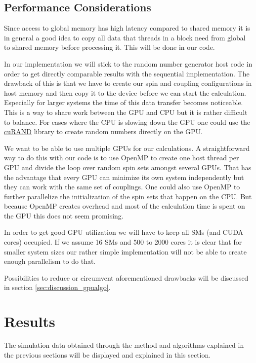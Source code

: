 \documentclass[paper=a4, fontsize=11pt]{scrartcl} %
\numberwithin{equation}{section} %
\numberwithin{figure}{section} %
\numberwithin{table}{section} %
\begin{document}
\subsection{Performance Considerations}
Since access to global memory has high latency compared to shared memory it is in general a good idea to copy all data that threads in a block need from global to shared memory before processing it. This will be done in our code.

In our implementation we will stick to the random number generator host code in order to get directly comparable results with the sequential implementation. The drawback of this is that we have to create our spin and coupling configurations in host memory and then copy it to the device before we can start the calculation. Especially for larger systems the time of this data transfer becomes noticeable. This is a way to share work between the GPU and CPU but it is rather difficult to balance. For cases where the CPU is slowing down the GPU one could use the \href{http://docs.nvidia.com/cuda/curand/index.html}{cuRAND} library to create random numbers directly on the GPU.

We want to be able to use multiple GPUs for our calculations. A straightforward way to do this with our code is to use OpenMP to create one host thread per GPU and divide the loop over random spin sets amongst several GPUs. That has the advantage that every GPU can minimize its own system independently but they can work with the same set of couplings. One could also use OpenMP to further parallelize the initialization of the spin sets that happen on the CPU. But because OpenMP creates overhead and most of the calculation time is spent on the GPU this does not seem promising.

In order to get good GPU utilization we will have to keep all SMs (and CUDA cores) occupied. If we assume 16 SMs and 500 to 2000 cores it is clear that for smaller system sizes our rather simple implementation will not be able to create enough parallelism to do that.

Possibilities to reduce or circumvent aforementioned drawbacks will be discussed in section \ref{sec:discussion_gpualgo}.

\section{Results}
\label{sec:results}
The simulation data obtained through the method and algorithms explained in the previous sections will be displayed and explained in this section.
\end{document}
